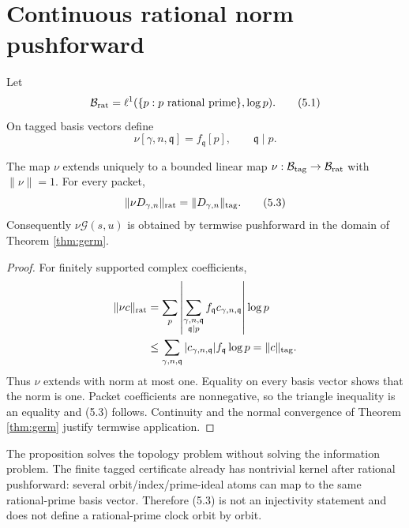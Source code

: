 \section{Continuous rational norm pushforward}

Let
\[
\mathcal B_{\mathrm{rat}}=\ell^1(\{p:p\text{ rational prime}\},\log p).
\tag{5.1}
\]
On tagged basis vectors define
\[
\nu[\gamma,n,\mathfrak q]=f_{\mathfrak q}[p],
\qquad \mathfrak q\mid p.
\tag{5.2}
\]

\begin{proposition}\label{prop:pushforward}
The map $\nu$ extends uniquely to a bounded linear map
$\nu:\mathcal B_{\mathrm{tag}}\to\mathcal B_{\mathrm{rat}}$ with $\|\nu\|=1$.  For every packet,
\[
\|\nu D_{\gamma,n}\|_{\rm rat}
=\|D_{\gamma,n}\|_{\rm tag}.
\tag{5.3}
\]
Consequently $\nu\mathcal G(s,u)$ is obtained by termwise pushforward in the
domain of Theorem \ref{thm:germ}.
\end{proposition}

\begin{proof}
For finitely supported complex coefficients,
\[
\begin{aligned}
\|\nu c\|_{\rm rat}
&=\sum_p\left|
\sum_{\substack{\gamma,n,\mathfrak q\\\mathfrak q\mid p}}
f_{\mathfrak q}c_{\gamma,n,\mathfrak q}\right|\log p\\
&\le\sum_{\gamma,n,\mathfrak q}
|c_{\gamma,n,\mathfrak q}|f_{\mathfrak q}\log p
=\|c\|_{\rm tag}.
\end{aligned}
\]
Thus $\nu$ extends with norm at most one.  Equality on every basis vector
shows that the norm is one.  Packet coefficients are nonnegative, so the
triangle inequality is an equality and (5.3) follows.  Continuity and the
normal convergence of Theorem \ref{thm:germ} justify termwise application.
\end{proof}

The proposition solves the topology problem without solving the information
problem.  The finite tagged certificate already has nontrivial kernel after
rational pushforward: several orbit/index/prime-ideal atoms can map to the
same rational-prime basis vector.  Therefore (5.3) is not an injectivity
statement and does not define a rational-prime clock orbit by orbit.
